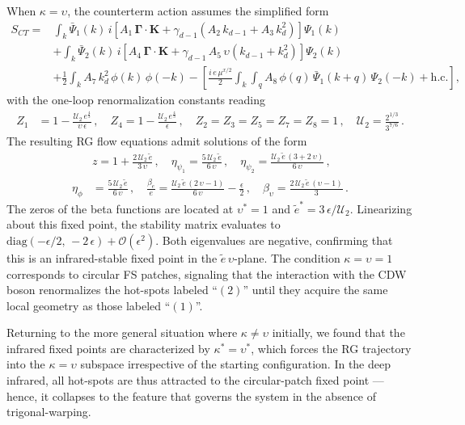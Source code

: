 When $\kappa = \upsilon$, the counterterm action assumes the simplified form
\begin{align}
\label{actcount2}
S_{CT} = & \int_k \bar{\Psi}_1(k)\,i\left[A_1\,\boldsymbol{\Gamma}
\cdot\mathbf{K} + \gamma_{d-1}\left(A_2\,k_{d-1} + 
A_3\,k_d^2\right)\right]\Psi_1(k) \nonumber \\
& + \int_k \bar{\Psi}_2(k)\,i\left[A_4\,\boldsymbol{\Gamma}
\cdot\mathbf{K} + \gamma_{d-1}\,A_5\,\upsilon
\left(k_{d-1} + k_d^2\right)\right]\Psi_2(k) \nonumber \\
& + \frac{1}{2}\int_k A_7\,k_d^2\,\phi(k)\,\phi(-k)
- \left[\frac{i\,e\,\mu^{x/2}}{2}\int_k\int_q A_8\,\phi(q)\,
\bar{\Psi}_1(k+q)\,\Psi_2(-k) + \text{h.c.}\right],
\end{align}
with the one-loop renormalization constants reading
\begin{align}
\label{eqZvals}
Z_1 &= 1 - \frac{\mathcal{U}_2\,e^{\frac{4}{3}}}{\upsilon\,\epsilon}\,, 
\quad Z_4 = 1 - \frac{\mathcal{U}_2\,e^{\frac{4}{3}}}{\epsilon}\,, \quad
Z_2 = Z_3 = Z_5 = Z_7 = Z_8 = 1\,, \quad
\mathcal{U}_2 = \frac{2^{1/3}}{3^{7/6}}\,.
\end{align}
The resulting RG flow equations admit solutions of the form
\begin{align}
& z = 1 + \frac{2\,\mathcal{U}_2\,\tilde{e}}{3\,\upsilon}\,, \quad
\eta_{\psi_1} = \frac{5\,\mathcal{U}_2\,\tilde{e}}{6\,\upsilon}\,, \quad
\eta_{\psi_2} = \frac{\mathcal{U}_2\,\tilde{e}\,(3 + 2\,\upsilon)}
{6\,\upsilon}\,, \nonumber \\
\eta_\phi &= \frac{5\,\mathcal{U}_2\,\tilde{e}}{6\,\upsilon}\,, \quad
\frac{\beta_e}{e} = \frac{\mathcal{U}_2\,\tilde{e}\,(2\,\upsilon - 1)}
{6\,\upsilon} - \frac{\epsilon}{2}\,, \quad
\beta_\upsilon = \frac{2\,\mathcal{U}_2\,\tilde{e}\,(\upsilon - 1)}{3}\,.
\end{align}
The zeros of the beta functions are located at $\upsilon^* = 1$ and 
$\tilde{e}^* = 3\,\epsilon/\mathcal{U}_2$. Linearizing about this 
fixed point, the stability matrix evaluates to 
$\text{diag}(-\epsilon/2,\,-2\,\epsilon) + \mathcal{O}(\epsilon^2)$. 
Both eigenvalues are negative, confirming that this is an infrared-stable 
fixed point in the $\tilde{e}\,\upsilon$-plane. The condition 
$\kappa = \upsilon = 1$ corresponds to circular FS patches, signaling 
that the interaction with the CDW boson renormalizes the hot-spots 
labeled ``$(2)$'' until they acquire the same local geometry as those 
labeled ``$(1)$''.

Returning to the more general situation where $\kappa \neq \upsilon$ 
initially, we found that the infrared fixed points are characterized by 
$\kappa^* = \upsilon^*$, which forces the RG trajectory into the 
$\kappa = \upsilon$ subspace irrespective of the starting configuration. 
In the deep infrared, all hot-spots are thus attracted to the 
circular-patch fixed point --- hence, it collapses to the feature that governs 
the system in the absence of trigonal-warping.

